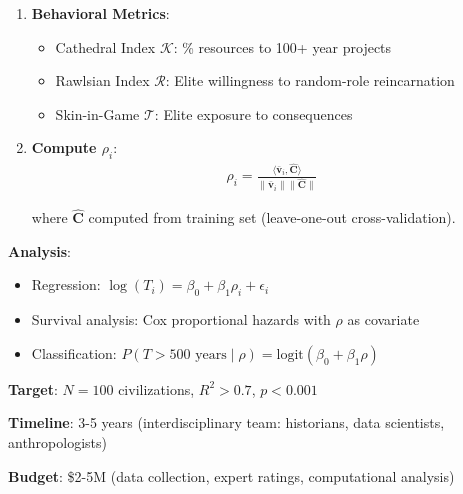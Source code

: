 \documentclass[11pt,a4paper]{article}
\theoremstyle{definition}
\theoremstyle{remark}
\begin{document}
\begin{small}
\begin{enumerate}
\begin{protocol}
\begin{enumerate}
    \item \textbf{Behavioral Metrics}:
        \begin{itemize}
            \item Cathedral Index \(\mathcal{K}\): \% resources to 100+ year projects
            \item Rawlsian Index \(\mathcal{R}\): Elite willingness to random-role reincarnation
            \item Skin-in-Game \(\mathcal{T}\): Elite exposure to consequences
        \end{itemize}
    
    \item \textbf{Compute \(\rho_i\)}:
        \begin{align}
        \rho_i = \frac{\langle \bar{\mathbf{v}}_i, \hat{\mathbf{C}} \rangle}{\|\bar{\mathbf{v}}_i\| \|\hat{\mathbf{C}}\|}
        \end{align}
        
        where \(\hat{\mathbf{C}}\) computed from training set (leave-one-out cross-validation).
\end{enumerate}

\textbf{Analysis}:
\begin{itemize}
    \item Regression: \(\log(T_i) = \beta_0 + \beta_1 \rho_i + \epsilon_i\)
    \item Survival analysis: Cox proportional hazards with \(\rho\) as covariate
    \item Classification: \(P(T > 500 \text{ years} \mid \rho) = \text{logit}(\beta_0 + \beta_1 \rho)\)
\end{itemize}

\textbf{Target}: \(N = 100\) civilizations, \(R^2 > 0.7\), \(p < 0.001\)

\textbf{Timeline}: 3-5 years (interdisciplinary team: historians, data scientists, anthropologists)

\textbf{Budget}: \$2-5M (data collection, expert ratings, computational analysis)
\end{protocol}

\begin{figure}[H]
\centering
{}
\end{figure}
\end{enumerate}
\end{small}
\end{document}
